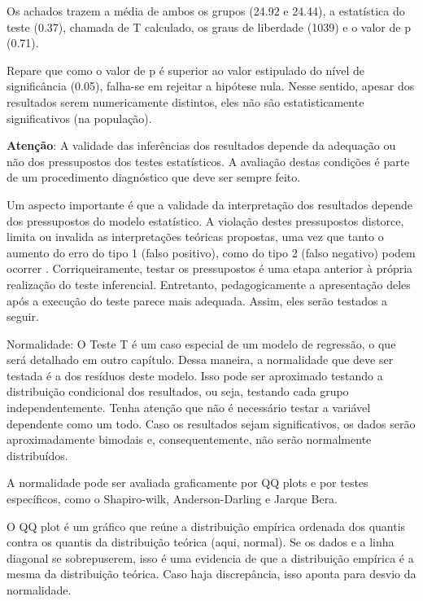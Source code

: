 \documentclass[
]{book}
\newenvironment{warning}{
  \definecolor{shadecolor}{rgb}{0, 0, 0}  %
  \color{white}
  \begin{shaded}}
 {\end{shaded}}
\begin{document}
Os achados trazem a média de ambos os grupos (24.92 e 24.44), a estatística do teste (0.37), chamada de T calculado, os graus de liberdade (1039) e o valor de p (0.71).

Repare que como o valor de p é superior ao valor estipulado do nível de significância (0.05), falha-se em rejeitar a hipótese nula. Nesse sentido, apesar dos resultados serem numericamente distintos, eles não são estatisticamente significativos (na população).

\begin{warning}

\textbf{Atenção}: A validade das inferências dos resultados depende da adequação ou não dos pressupostos dos testes estatísticos. A avaliação destas condições é parte de um procedimento diagnóstico que deve ser sempre feito.

\end{warning}

Um aspecto importante é que a validade da interpretação dos resultados depende dos pressupostos do modelo estatístico. A violação destes pressupostos distorce, limita ou invalida as interpretações teóricas propostas, uma vez que tanto o aumento do erro do tipo 1 (falso positivo), como do tipo 2 (falso negativo) podem ocorrer \citep{Lix1996, Barker2015, Ernst2017}. Corriqueiramente, testar os pressupostos é uma etapa anterior à própria realização do teste inferencial. Entretanto, pedagogicamente a apresentação deles após a execução do teste parece mais adequada. Assim, eles serão testados a seguir.

Normalidade: O Teste T é um caso especial de um modelo de regressão, o que será detalhado em outro capítulo. Dessa maneira, a normalidade que deve ser testada é a dos resíduos deste modelo. Isso pode ser aproximado testando a distribuição condicional dos resultados, ou seja, testando cada grupo independentemente. Tenha atenção que não é necessário testar a variável dependente como um todo. Caso os resultados sejam significativos, os dados serão aproximadamente bimodais e, consequentemente, não serão normalmente distribuídos.

A normalidade pode ser avaliada graficamente por QQ plots e por testes específicos, como o Shapiro-wilk, Anderson-Darling e Jarque Bera.

O QQ plot é um gráfico que reúne a distribuição empírica ordenada dos quantis contra os quantis da distribuição teórica (aqui, normal). Se os dados e a linha diagonal se sobrepuserem, isso é uma evidencia de que a distribuição empírica é a mesma da distribuição teórica. Caso haja discrepância, isso aponta para desvio da normalidade.
\end{document}
